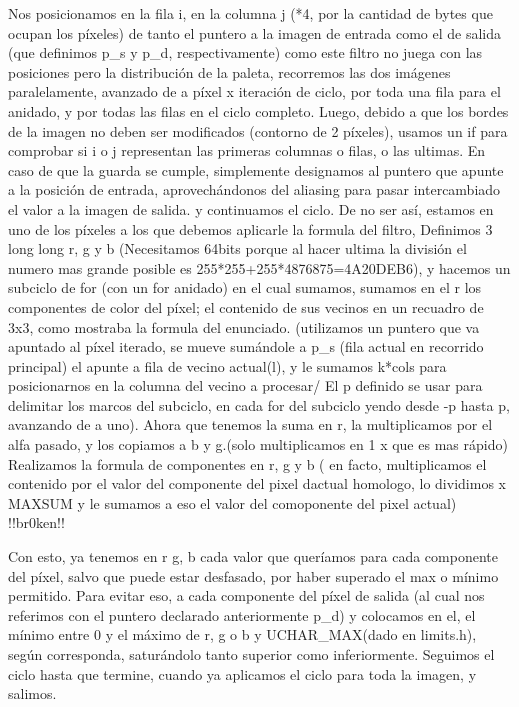 \documentclass[a4paper]{article}
\begin{document}
        Nos posicionamos en la fila i, en la columna j (*4, por la cantidad de bytes que ocupan los píxeles) de tanto el puntero a la imagen de entrada como el de salida (que definimos p_s y p_d, respectivamente) como este filtro no juega con las posiciones pero la distribución de la paleta, recorremos las dos imágenes paralelamente, avanzado de a píxel x iteración de ciclo, por toda una fila para el anidado, y por todas las filas en el ciclo completo.
        \hfill \break   
        Luego, debido a que los bordes de la imagen no deben ser modificados (contorno de 2 píxeles), usamos un if para comprobar si i o j representan las primeras columnas o filas, o las ultimas. En caso de que la guarda se cumple, simplemente designamos al puntero que apunte a la posición de entrada, aprovechándonos del aliasing para pasar intercambiado el valor a la imagen de salida. y continuamos el ciclo.
        \hfill \break   
        De no ser así, estamos en uno de los píxeles a los que debemos aplicarle la formula del filtro, Definimos 3 long long r, g y b (Necesitamos 64bits porque al hacer ultima la división el numero mas grande posible es 255*255+255*4876875=4A20DEB6), y hacemos un subciclo de for (con un for anidado) en el cual sumamos, sumamos en el r los componentes de color del píxel; el contenido de sus vecinos en un recuadro de 3x3, como mostraba la formula del enunciado. (utilizamos un puntero que va apuntado al píxel iterado, se mueve sumándole a p_s (fila actual en recorrido principal) el apunte a fila de vecino actual(l), y le sumamos k*cols para posicionarnos en la columna del vecino a procesar/ El p definido se usar  para delimitar los marcos del subciclo, en cada for del subciclo yendo desde -p hasta p, avanzando de a uno).
        \hfill \break   
        Ahora que tenemos   la suma en r, la multiplicamos por el alfa pasado, y los copiamos a b y g.(solo multiplicamos en 1 x que es mas rápido) \hfill \break       
        Realizamos la formula de componentes en r, g y b ( en facto, multiplicamos el contenido por el valor del componente del pixel dactual homologo, lo dividimos x MAXSUM y le sumamos a eso el valor del comoponente del pixel actual)
        \hfill \break   !!br0ken!!
        
        Con esto, ya tenemos en r g, b cada  valor que queríamos para cada componente del píxel, salvo que puede estar desfasado, por haber superado el max o mínimo permitido. Para evitar eso,  a cada componente del píxel de salida (al cual nos referimos con el puntero declarado anteriormente p_d) y colocamos en el, el mínimo entre 0 y el máximo de r, g o b y UCHAR_MAX(dado en limits.h), según corresponda, saturándolo tanto superior como inferiormente.
        \hfill \break   
        Seguimos el ciclo hasta que termine, cuando ya aplicamos el ciclo para toda la imagen, y salimos.
        \hfill \break   
        
\end{document}
